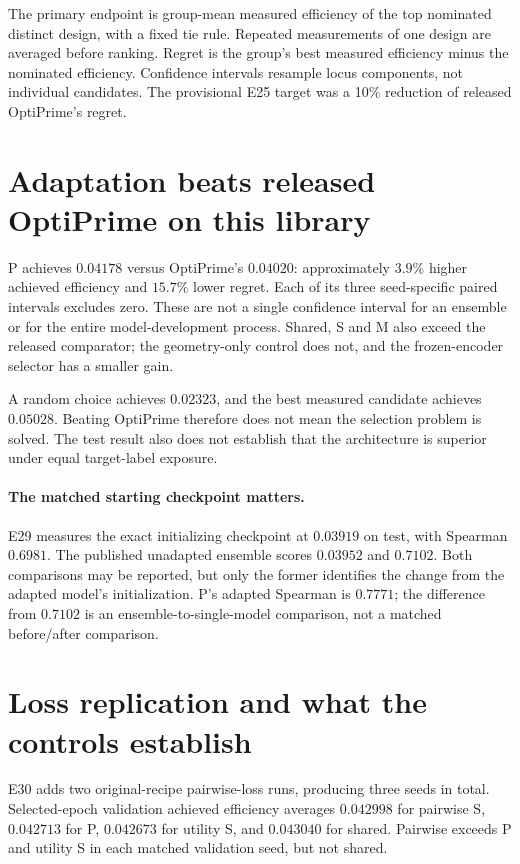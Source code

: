 \documentclass[11pt]{article}
\begin{document}
The primary endpoint is group-mean measured efficiency of the top nominated distinct
design, with a fixed tie rule. Repeated measurements of one design are averaged before
ranking. Regret is the group's best measured efficiency minus the nominated efficiency.
Confidence intervals resample locus components, not individual candidates.
The provisional E25 target was a 10\% reduction of released OptiPrime's regret.

\section{Adaptation beats released OptiPrime on this library}

P achieves $0.04178$ versus OptiPrime's $0.04020$: approximately $3.9\%$ higher achieved
efficiency and $15.7\%$ lower regret. Each of its three seed-specific paired intervals
excludes zero. These are not a single confidence interval for an ensemble or for the
entire model-development process. Shared, S and M also exceed the released comparator;
the geometry-only control does not, and the frozen-encoder selector has a smaller gain.

A random choice achieves $0.02323$, and the best measured candidate achieves $0.05028$.
Beating OptiPrime therefore does not mean the selection problem is solved. The test result
also does not establish that the architecture is superior under equal target-label exposure.

\paragraph{The matched starting checkpoint matters.}
E29 measures the exact initializing checkpoint at $0.03919$ on test, with Spearman $0.6981$.
The published unadapted ensemble scores $0.03952$ and $0.7102$. Both comparisons may be
reported, but only the former identifies the change from the adapted model's initialization.
P's adapted Spearman is $0.7771$; the difference from $0.7102$ is an ensemble-to-single-model
comparison, not a matched before/after comparison.

\section{Loss replication and what the controls establish}


E30 adds two original-recipe pairwise-loss runs, producing three seeds in total.
Selected-epoch validation achieved efficiency averages $0.042998$ for pairwise S,
$0.042713$ for P, $0.042673$ for utility S, and $0.043040$ for shared.
Pairwise exceeds P and utility S in each matched validation seed, but not shared.
\end{document}
